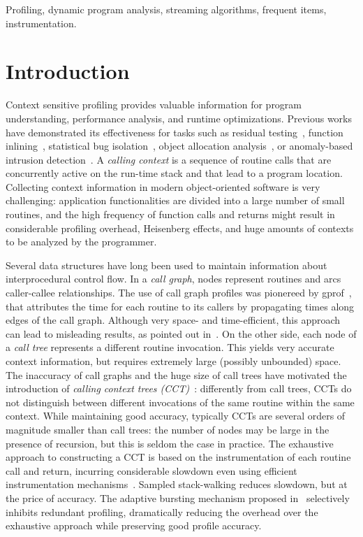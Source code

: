 \documentclass[preprint]{sigplanconf}
\begin{document}
\keywords Profiling, dynamic program analysis, streaming algorithms, frequent items, instrumentation.


\section{Introduction}
\label{se:intro}

Context sensitive profiling provides valuable information for program understanding, performance analysis, and runtime optimizations. Previous works have demonstrated its effectiveness for tasks such as residual testing~\cite{PavlopoulouY99, VNC07}, function inlining~\cite{CMCH92}, statistical bug isolation~\cite{Feng03, Liblit03}, object allocation analysis~\cite{NethercoteS07}, or anomaly-based intrusion detection~\cite{BM07}. A {\em calling context} is a sequence of routine calls that are concurrently active on the run-time stack and that lead to a program location. Collecting context information in modern object-oriented software is very challenging: application functionalities are divided into a large number of small routines, and the high frequency of function calls and returns might result in considerable profiling overhead, Heisenberg effects, and huge amounts of contexts to be analyzed by the programmer.

Several data structures have long been used to maintain information about interprocedural control flow. In a {\em call graph}, nodes represent routines and arcs caller-callee relationships. The use of call graph profiles was pionereed by gprof~\cite{GKM82}, that attributes the time for each  routine to its callers by propagating times along edges of the call graph. Although very space- and time-efficient, this approach can lead to misleading results, as pointed out in~\cite{PF88, S04}. On the other side, each node of a {\em call tree} represents a different routine invocation. This yields very accurate context information, but requires extremely large (possibly unbounded) space.
The inaccuracy of call graphs and the huge size of call trees have motivated the introduction of {\em calling context trees (CCT)}~\cite{ABL97}: differently from call trees, CCTs do not distinguish between different invocations of the same routine within the same context. While maintaining good accuracy, typically CCTs are several orders of magnitude smaller than call trees: the number of nodes may be large in the presence of recursion, but this is seldom the case in practice. The exhaustive approach to constructing a CCT is based on the instrumentation of each routine call and return, incurring considerable slowdown even using efficient instrumentation mechanisms~\cite{ABL97,ZSCC06}. Sampled stack-walking reduces slowdown, but at the price of accuracy. The adaptive bursting mechanism proposed in~\cite{ZSCC06} selectively inhibits redundant profiling, dramatically reducing the overhead over the exhaustive approach while preserving good profile accuracy.
\end{document}
